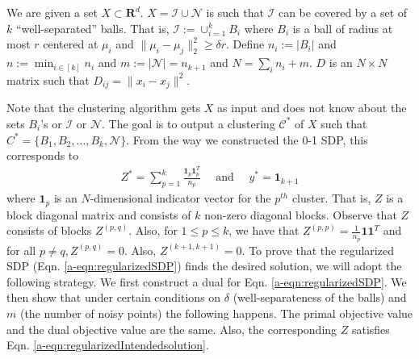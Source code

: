 \documentclass[12pt]{article}
\newcommand{\mc}{\mathcal}
\newcommand{\mb}{\mathbf}
\begin{document}
We are given a set $X \subset \mb R^d$. $X = \mc I \cup \mc N$ is such that $\mc I$ can be covered by a set of $k$ ``well-separated'' balls. That is, $\mc I := \cup_{i=1}^k B_i$ where $B_i$ is a ball of radius at most $r$ centered at $\mu_i$ and $\|\mu_i - \mu_j\|_{2}^{2} \ge \delta r$. %
Define $n_i := |B_i|$ and $n := \min_{i\in[k]} n_i$ and $m := |\mc N| = n_{k+1}$ and $N = \sum_i n_i + m$. $D$ is an $N\times N$ matrix such that $D_{ij} = \|x_i -x_j\|^2$.  

Note that the clustering algorithm gets $X$ as input and does not know about the sets $B_i$'s or $\mc I$ or $\mc N$. The goal is to output a clustering $\mc C^*$ of $X$ such that $C^* = \{B_1, B_2, \ldots, B_k, \mc N\}$. From the way we constructed the 0-1 SDP, this corresponds to
\begin{align}
  Z^* = \sum_{p=1}^k \frac{\mb 1_p \mb 1_{p}^T}{n_p} \enspace\enspace\text{ and }\enspace\enspace y^* = \mb 1_{k+1}\label{a-eqn:regularizedIntendedsolution}
\end{align}
where $\mb 1_p$ is an $N$-dimensional indicator vector for the $p^{th}$ cluster. That is, $Z$ is a block diagonal matrix and consists of $k$ non-zero diagonal blocks. Observe that $Z$ consists of blocks $Z^{(p, q)}$. Also, for $1\le p \le k$, we have that $Z^{(p, p)} = \frac{1}{n_p}\mb 1\mb 1^T$ and for all $p \neq q, Z^{(p, q)} = 0$. Also, $Z^{(k+1, k+1)} = 0$. To prove that the regularized SDP (Eqn. \ref{a-eqn:regularizedSDP}) finds the desired solution, we  will adopt the following strategy. We first construct a dual for Eqn. \ref{a-eqn:regularizedSDP}. We then show that under certain conditions on $\delta$ (well-separateness of the balls) and $m$ (the number of noisy points) the following happens. The primal objective value and the dual objective value are the same. Also, the corresponding $Z$ satisfies Eqn. \ref{a-eqn:regularizedIntendedsolution}. 
\end{document}
